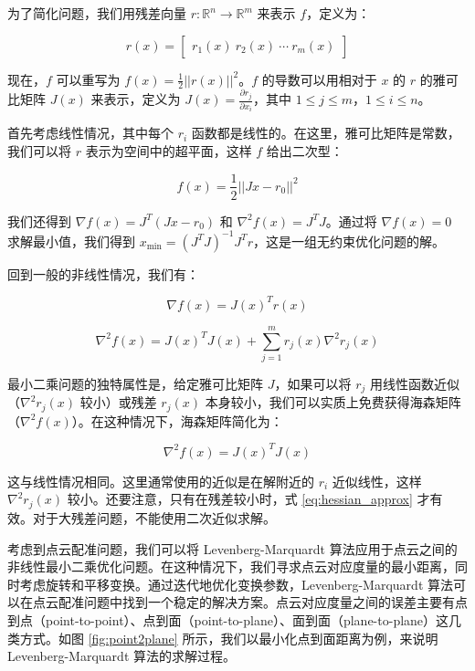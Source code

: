 为了简化问题，我们用残差向量 $r : \mathbb{R}^n \rightarrow \mathbb{R}^m$ 来表示 $f$，定义为：

\begin{equation}
r(x) =
\begin{bmatrix}
r_1(x) \
r_2(x) \
\cdots \
r_m(x)
\end{bmatrix}
\end{equation}

现在，$f$ 可以重写为 $f(x) = \frac{1}{2} ||r(x)||^2$。$f$ 的导数可以用相对于 $x$ 的 $r$ 的雅可比矩阵 $J(x)$ 来表示，定义为 $J(x) = \frac{\partial r_j}{\partial x_i}$，其中 $1 \leq j \leq m$，$1 \leq i \leq n$。

首先考虑线性情况，其中每个 $r_i$ 函数都是线性的。在这里，雅可比矩阵是常数，我们可以将 $r$ 表示为空间中的超平面，这样 $f$ 给出二次型：

\begin{equation}
f(x) = \frac{1}{2} ||Jx - r_0||^2
\end{equation}

我们还得到 $\nabla f(x) = J^T(Jx - r_0)$ 和 $\nabla^2 f(x) = J^TJ$。通过将 $\nabla f(x) = 0$ 求解最小值，我们得到 $x_\text{min} = (J^TJ)^{-1}J^Tr$，这是一组无约束优化问题的解。

回到一般的非线性情况，我们有：

\begin{equation}
\nabla f(x) = J(x)^T r(x)
\label{eq:grad}
\end{equation}

\begin{equation}
\nabla^2 f(x) = J(x)^TJ(x) + \sum_{j=1}^{m} r_j(x) \nabla^2 r_j(x)
\label{eq:hessian}
\end{equation}

最小二乘问题的独特属性是，给定雅可比矩阵 $J$，如果可以将 $r_j$ 用线性函数近似（$\nabla^2 r_j(x)$ 较小）或残差 $r_j(x)$ 本身较小，我们可以实质上免费获得海森矩阵（$\nabla^2 f(x)$）。在这种情况下，海森矩阵简化为：

\begin{equation}
\nabla^2 f(x) = J(x)^T J(x)
\label{eq:hessian_approx}
\end{equation}

这与线性情况相同。这里通常使用的近似是在解附近的 $r_i$ 近似线性，这样 $\nabla^2 r_j(x)$ 较小。还要注意，只有在残差较小时，式 \ref{eq:hessian_approx} 才有效。对于大残差问题，不能使用二次近似求解\cite{李娇娇2022基于深度学习的}。

考虑到点云配准问题，我们可以将 Levenberg-Marquardt 算法应用于点云之间的非线性最小二乘优化问题。在这种情况下，我们寻求点云对应度量的最小距离，同时考虑旋转和平移变换。通过迭代地优化变换参数，Levenberg-Marquardt 算法可以在点云配准问题中找到一个稳定的解决方案。点云对应度量之间的误差主要有点到点（point-to-point）、点到面（point-to-plane）、面到面（plane-to-plane）这几类方式。如图 \ref{fig:point2plane} 所示，我们以最小化点到面距离为例，来说明 Levenberg-Marquardt 算法的求解过程。

